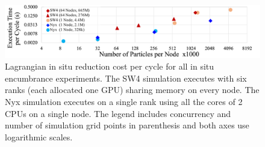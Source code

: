 \begin{figure}[!b]
\centering
\vspace{-4mm}
\includegraphics[width=\linewidth]{Images/InSituCost_Stretch2.pdf}
\vspace{-5mm}
\caption{Lagrangian in situ reduction cost per cycle for all in situ encumbrance experiments. The SW4 simulation executes with six ranks (each allocated one GPU) sharing memory on every node. The Nyx simulation executes on a single rank using all the cores of 2 CPUs on a single node. The legend includes concurrency and number of simulation grid points in parenthesis and both axes use logarithmic scales.} 
\vspace{-5mm}
\label{fig:insitucost}
\end{figure}
